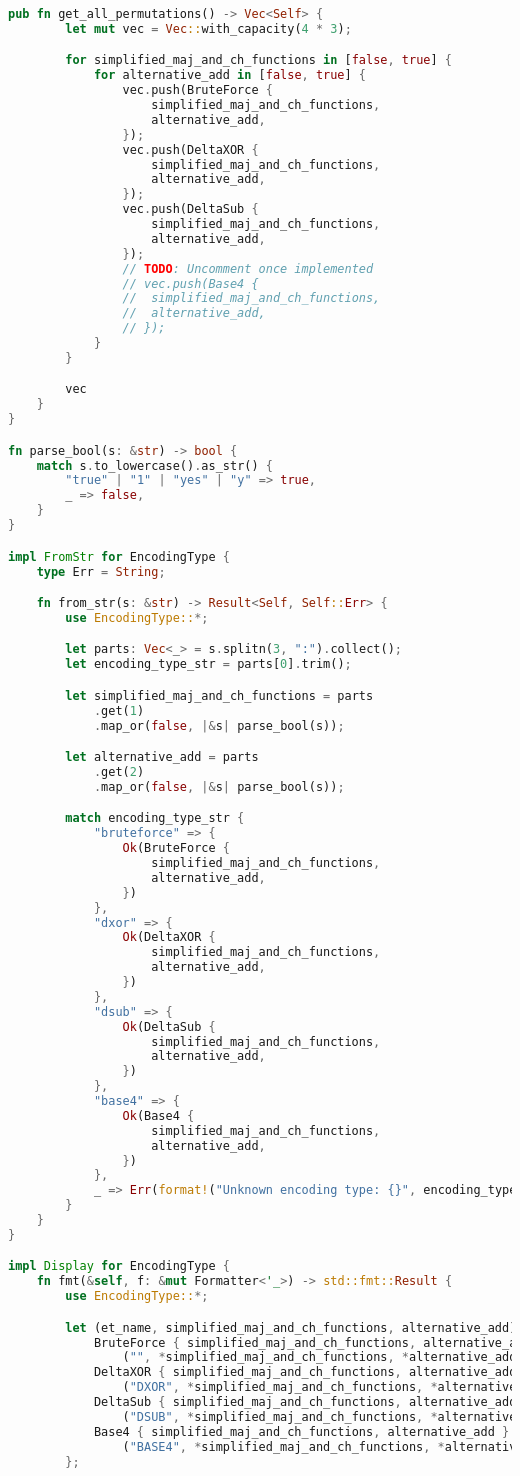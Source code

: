 \begin{lstlisting}[language=rust, caption={smt\_lib/smt\_retriever.rs}]
	pub fn get_all_permutations() -> Vec<Self> {
		let mut vec = Vec::with_capacity(4 * 3);

		for simplified_maj_and_ch_functions in [false, true] {
			for alternative_add in [false, true] {
				vec.push(BruteForce {
					simplified_maj_and_ch_functions,
					alternative_add,
				});
				vec.push(DeltaXOR {
					simplified_maj_and_ch_functions,
					alternative_add,
				});
				vec.push(DeltaSub {
					simplified_maj_and_ch_functions,
					alternative_add,
				});
				// TODO: Uncomment once implemented
				// vec.push(Base4 {
				// 	simplified_maj_and_ch_functions,
				// 	alternative_add,
				// });
			}
		}

		vec
	}
}

fn parse_bool(s: &str) -> bool {
	match s.to_lowercase().as_str() {
		"true" | "1" | "yes" | "y" => true,
		_ => false,
	}
}

impl FromStr for EncodingType {
	type Err = String;

	fn from_str(s: &str) -> Result<Self, Self::Err> {
		use EncodingType::*;

		let parts: Vec<_> = s.splitn(3, ":").collect();
		let encoding_type_str = parts[0].trim();

		let simplified_maj_and_ch_functions = parts
			.get(1)
			.map_or(false, |&s| parse_bool(s));

		let alternative_add = parts
			.get(2)
			.map_or(false, |&s| parse_bool(s));

		match encoding_type_str {
			"bruteforce" => {
				Ok(BruteForce {
					simplified_maj_and_ch_functions,
					alternative_add,
				})
			},
			"dxor" => {
				Ok(DeltaXOR {
					simplified_maj_and_ch_functions,
					alternative_add,
				})
			},
			"dsub" => {
				Ok(DeltaSub {
					simplified_maj_and_ch_functions,
					alternative_add,
				})
			},
			"base4" => {
				Ok(Base4 {
					simplified_maj_and_ch_functions,
					alternative_add,
				})
			},
			_ => Err(format!("Unknown encoding type: {}", encoding_type_str)),
		}
	}
}

impl Display for EncodingType {
	fn fmt(&self, f: &mut Formatter<'_>) -> std::fmt::Result {
		use EncodingType::*;

		let (et_name, simplified_maj_and_ch_functions, alternative_add) = match self {
			BruteForce { simplified_maj_and_ch_functions, alternative_add } =>
				("", *simplified_maj_and_ch_functions, *alternative_add),
			DeltaXOR { simplified_maj_and_ch_functions, alternative_add } =>
				("DXOR", *simplified_maj_and_ch_functions, *alternative_add),
			DeltaSub { simplified_maj_and_ch_functions, alternative_add } =>
				("DSUB", *simplified_maj_and_ch_functions, *alternative_add),
			Base4 { simplified_maj_and_ch_functions, alternative_add } =>
				("BASE4", *simplified_maj_and_ch_functions, *alternative_add),
		};


\end{lstlisting}
